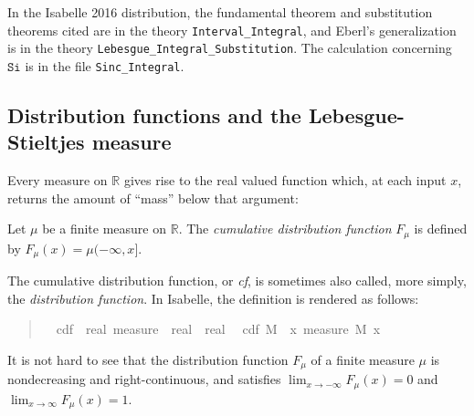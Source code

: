 \documentclass{svjour3}
\newcommand{\RR}{\mathbb{R}}
\newcommand{\fn}[1]{\mathtt{#1}} %
\begin{document}
In the Isabelle 2016 distribution, the fundamental theorem and substitution theorems cited are in the theory \verb=Interval_Integral=, and Eberl's generalization is in the theory \verb=Lebesgue_Integral_Substitution=. The calculation concerning $\fn{Si}$ is in the file \verb=Sinc_Integral=.

\subsection{Distribution functions and the Lebesgue-Stieltjes measure}

Every measure on $\RR$ gives rise to the real valued function which, at each input $x$, returns the amount of ``mass'' below that argument:

\begin{definition}
Let $\mu$ be a finite measure on $\RR$. The \emph{cumulative distribution function} $F_\mu$ is defined by $F_\mu(x) = \mu (-\infty, x]$.
\end{definition}
The cumulative distribution function, or \emph{cf}, is sometimes also called, more simply, the \emph{distribution function}. In Isabelle, the definition is rendered as follows:

\begin{quote}
\begin{isabellebody}
\isamarkupfalse%
\isanewline
\ \ cdf\ {\isacharcolon}{\isacharcolon}\ {\isachardoublequoteopen}real\ measure\ {\isasymRightarrow}\ real\ {\isasymRightarrow}\ real{\isachardoublequoteclose}\isanewline
{}\isanewline
\ \ {\isachardoublequoteopen}cdf\ M\ {\isasymequiv}\ {\isasymlambda}x{\isachardot}\ measure\ M\ {\isacharbraceleft}{\isachardot}{\isachardot}x{\isacharbraceright}{\isachardoublequoteclose}
\end{isabellebody}
\end{quote}

It is not hard to see that the distribution function $F_\mu$ of a finite measure $\mu$ is nondecreasing and right-continuous, and satisfies $\lim_{x \rightarrow -\infty} F_\mu(x) = 0$ and \linebreak $\lim_{x \rightarrow \infty} F_\mu(x) = 1$.
\end{document}
